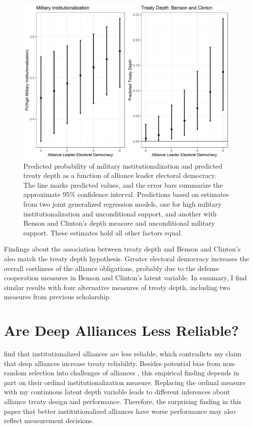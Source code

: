 \documentclass[12pt]{article}
\begin{document}
\begin{figure}
\includegraphics[width=.95\textwidth]{results-alt-measures.png}  
\caption{Predicted probability of military institutionalization and predicted treaty depth as a function of alliance leader electoral democracy. The line marks predicted values, and the error bars summarize the approximate 95\% confidence interval. Predictions based on estimates from two joint generalized regression models, one for high military institutionalization and unconditional support, and another with Benson and Clinton's depth measure and unconditional military support. These estimates hold all other factors equal.}
\label{fig:results-alt-measures}
\end{figure}


Findings about the association between treaty depth and Benson and Clinton's also match the treaty depth hypothesis. 
Greater electoral democracy increases the overall costliness of the alliance obligations, probably due to the defense cooperation measures in Benson and Clinton's latent variable. 
In summary, I find similar results with four alternative measures of treaty depth, including two measures from previous scholarship. 




\section{Are Deep Alliances Less Reliable?} 


\citet{LeedsAnac2005} find that institutionalized alliances are less reliable, which contradicts my claim that deep alliances increase treaty reliability. 
Besides potential bias from non-random selection into challenges of alliances \citep{Smith1995}, this empirical finding depends in part on their ordinal institutionalization measure. 
Replacing the ordinal measure with my continuous latent depth variable leads to different inferences about alliance treaty design and performance. 
Therefore, the surprising finding in this paper that better institutionalized alliances have worse performance may also reflect measurement decisions. 
\end{document}
